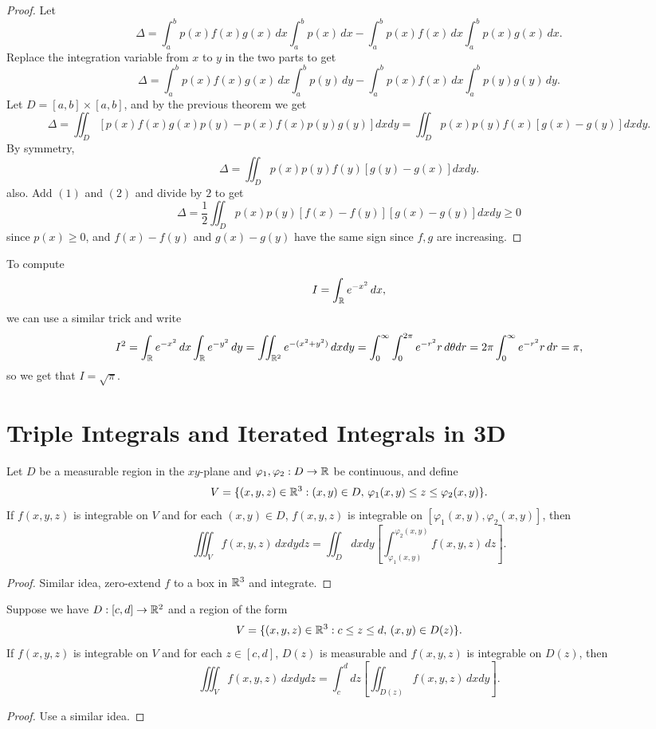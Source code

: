 \begin{proof}
  Let
  \[
  \Delta = \int_a^b p(x)f(x)g(x)\, dx \int_a^b p(x)\, dx - \int_a^b p(x)f(x)\, dx \int_a^b p(x)g(x)\, dx.
  \]
  Replace the integration variable from $x$ to $y$ in the
  two parts to get
  \[
    \Delta = \int_a^b p(x)f(x)g(x)\, dx \int_a^b p(y)\, dy
    - \int_a^b p(x)f(x)\, dx \int_a^b p(y)g(y)\, dy
  .\]
  Let $D = [a, b] \times [a, b]$, and by the previous
  theorem we get
  \[
    \Delta
    = \iint_D \left[p(x) f(x) g(x) p(y) - p(x) f(x) p(y) g(y)\right] dx dy
    = \iint_D p(x)p(y)f(x)\left[g(x) - g(y)\right] dx dy. \tag{1}
  \]
  By symmetry,
  \[
    \Delta = \iint_D p(x)p(y)f(y) \left[g(y) - g(x)\right] dx dy \tag{2}.
  \]
  also. Add $(1)$ and $(2)$ and divide by $2$ to get
  \[
    \Delta = \frac{1}{2} \iint_D p(x) p(y) [f(x) - f(y)][g(x) - g(y)] dx dy \ge 0
  \]
  since $p(x) \ge 0$, and $f(x) - f(y)$ and
  $g(x) - g(y)$ have the same sign since $f, g$ are
  increasing.
\end{proof}

\begin{example}
  To compute
  \[
    I = \int_{\mathbb{R}} e^{-x^2} \, dx,
  \]
  we can use a similar trick and write
  \[
    I^2 = \int_{\mathbb{R}} e^{-x^2} \, dx \int_{\mathbb{R}} e^{-y^2} \, dy
    = \iint_{\mathbb{R}^2} e^{-(x^2 + y^2)} \, dx dy
    = \int_0^\infty \int_0^{2\pi} e^{-r^2} r \, d\theta dr
    = 2\pi \int_0^\infty e^{-r^2} r \, dr
    = \pi,
  \]
  so we get that $I = \sqrt{\pi}$.
\end{example}

\section{Triple Integrals and Iterated Integrals in 3D}
\begin{theorem}
  Let $D$ be a measurable region in the $xy$-plane and
  $\varphi_1, \varphi_2 : D \to \mathbb{R}$ be continuous, and
  define
  \[
    V = \{(x, y, z) \in \mathbb{R}^3 : (x, y) \in D,\, \varphi_1(x, y) \le z \le \varphi_2(x, y)\}.
  \]
  If $f(x, y, z)$ is integrable on $V$ and for each
  $(x, y) \in D$, $f(x, y, z)$ is integrable on
  $[\varphi_1(x, y), \varphi_2(x, y)]$, then
  \[
    \iiint_V f(x, y, z)\, dx dy dz
    = \iint_D dxdy \left[\int_{\varphi_1(x, y)}^{\varphi_2(x, y)} f(x, y, z)\, dz\right].
  \]
\end{theorem}

\begin{proof}
  Similar idea, zero-extend $f$ to a box in $\mathbb{R}^3$ and
  integrate.
\end{proof}

\begin{theorem}
  Suppose we have $D : [c, d] \to \mathbb{R}^2$ and a region of
  the form
  \[
    V = \{(x, y, z) \in \mathbb{R}^3 : c \le z \le d,\, (x, y) \in D(z)\}.
  \]
  If $f(x, y, z)$ is integrable on $V$ and for each
  $z \in [c, d]$, $D(z)$ is measurable and
  $f(x, y, z)$ is integrable on $D(z)$, then
  \[
    \iiint_V f(x, y, z)\, dx dy dz
    = \int_c^d dz \left[\iint_{D(z)} f(x, y, z)\, dx dy\right].
  \]
\end{theorem}

\begin{proof}
  Use a similar idea.
\end{proof}
